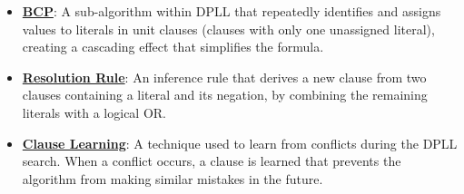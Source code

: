 \documentclass{article}%
\begin{document}
\begin{itemize}[leftmargin=*]
\item \href{https://purdue.brightspace.com/d2l/common/assets/pdfjs-d2l-dist/1.0.14-legacy/web/viewer.html?file=\%2Fcontent\%2Fenforced\%2F1095467-wl.202510.CS.24300.001\%2F15L2-SAT.pdf\%3Fou\%3D1095467\&lang=en-us\&container=d2l-fileviewer-rendered-pdf\&fullscreen=d2l-fileviewer-rendered-pdf-dialog\&height=667#page=20}{\textbf{BCP}}: A sub-algorithm within DPLL that repeatedly identifies and assigns values to literals in unit clauses (clauses with only one unassigned literal), creating a cascading effect that simplifies the formula.%
\item \href{https://purdue.brightspace.com/d2l/common/assets/pdfjs-d2l-dist/1.0.14-legacy/web/viewer.html?file=\%2Fcontent\%2Fenforced\%2F1095467-wl.202510.CS.24300.001\%2F15L2-SAT.pdf\%3Fou\%3D1095467\&lang=en-us\&container=d2l-fileviewer-rendered-pdf\&fullscreen=d2l-fileviewer-rendered-pdf-dialog\&height=667#page=32}{\textbf{Resolution Rule}}: An inference rule that derives a new clause from two clauses containing a literal and its negation, by combining the remaining literals with a logical OR.%
\item \href{https://purdue.brightspace.com/d2l/common/assets/pdfjs-d2l-dist/1.0.14-legacy/web/viewer.html?file=\%2Fcontent\%2Fenforced\%2F1095467-wl.202510.CS.24300.001\%2F15L2-SAT.pdf\%3Fou\%3D1095467\&lang=en-us\&container=d2l-fileviewer-rendered-pdf\&fullscreen=d2l-fileviewer-rendered-pdf-dialog\&height=667#page=35}{\textbf{Clause Learning}}: A technique used to learn from conflicts during the DPLL search. When a conflict occurs, a clause is learned that prevents the algorithm from making similar mistakes in the future.%
\end{itemize}

%
\end{document}

